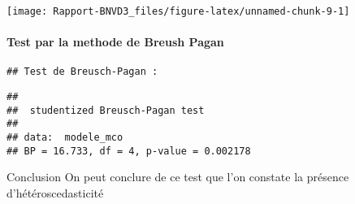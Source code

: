\documentclass[
]{article}
\begin{document}
\begin{center}\texttt{[image: Rapport-BNVD3\_files/figure-latex/unnamed-chunk-9-1]} \end{center}

\paragraph{Test par la methode de Breush
Pagan}\label{test-par-la-methode-de-breush-pagan}

\begin{verbatim}
## Test de Breusch-Pagan :
\end{verbatim}

\begin{verbatim}
## 
##  studentized Breusch-Pagan test
## 
## data:  modele_mco
## BP = 16.733, df = 4, p-value = 0.002178
\end{verbatim}

Conclusion \n On peut conclure de ce test que l'on constate la présence
d'hétéroscedasticité

\subsubsection{}\label{section}
\end{document}
